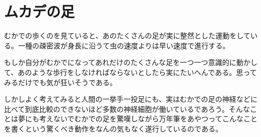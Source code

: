 \section{ムカデの足}
むかでの歩くのを見ていると、あのたくさんの足が実に整然とした運動をしている。一種の疎密波が身長に沿うて虫の速度よりは早い速度で進行する。

もしか自分がむかでになってあれだけのたくさんな足を一つ一つ意識的に動かして、あのような歩行をしなければならないとしたら実にたいへんである。思ってみるだけでも気が狂いそうである。

しかしよく考えてみると人間の一挙手一投足にも、実はむかでの足の神経などに比べて到底比較のできないほど多数の神経細胞が働いているであろう。そんなことは夢にも考えないでむかでの足を驚嘆しながら万年筆をあやつってこんなことを書くという驚くべき動作をなんの気もなく遂行しているのである。